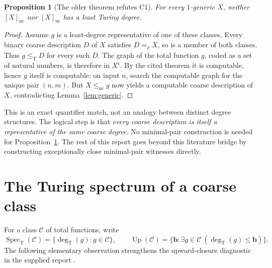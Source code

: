 \documentclass[11pt,a4paper]{article}
\newcommand{\leT}{\leq_{\mathrm T}}
\newcommand{\degT}{\operatorname{deg}_{\mathrm T}}
\newcommand{\Spec}{\operatorname{Spec}_{\mathrm T}}
\newcommand{\Up}{\operatorname{Up}}
\newcommand{\nc}{\mathrm{nc}}
\newcommand{\uc}{\mathrm{uc}}
\newtheorem{proposition}[theorem]{Proposition}
\theoremstyle{definition}\newtheorem{definition}[theorem]{Definition}
\theoremstyle{remark}\newtheorem{remark}[theorem]{Remark}
\begin{document}
\begin{proposition}[The older theorem refutes C1]\label{prop:old}
For every $1$-generic $X$, neither $[X]_{\nc}$ nor $[X]_{\uc}$ has a least
Turing degree.
\end{proposition}
\begin{proof}
Assume $g$ is a least-degree representative of one of these classes.
Every binary coarse description $D$ of $X$ satisfies $D=_{\rho}X$, so is a
member of both classes. Thus $g\leT D$ for every such $D$.
The graph of the total function $g$, coded as a set of natural numbers, is
therefore in $X^{\mathfrak c}$. By the cited theorem it is computable, hence
$g$ itself is computable: on input $n$, search the computable graph for the
unique pair $(n,m)$. But $X\leq_{\nc}g$ now yields a computable coarse
description of $X$, contradicting Lemma~\ref{lem:generic}.
\end{proof}

This is an exact quantifier match, not an analogy between distinct degree
structures. The logical step is that \emph{every coarse description is itself
a representative of the same coarse degree}. No minimal-pair construction is
needed for Proposition~\ref{prop:old}. The rest of this report goes beyond this
literature bridge by constructing exceptionally close minimal-pair witnesses
directly.

\section{The Turing spectrum of a coarse class}
\label{sec:spectra}

For a class $\mathcal C$ of total functions, write
\[
 \Spec(\mathcal C)=\{\degT(g):g\in\mathcal C\},\qquad
 \Up(\mathcal C)=\{\mathbf b:\exists g\in\mathcal C\ (\degT(g)\le\mathbf b)\}.
\]
The following elementary observation strengthens the upward-closure diagnostic
in the supplied report \cite[Section~5]{Input}.
\end{document}
